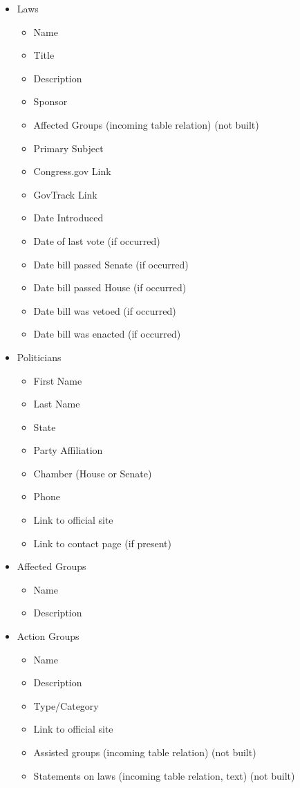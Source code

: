 \documentclass[12pt]{article}
\begin{document}
\begin{itemize}
	\item[] Laws
	\begin{itemize}
		\item Name
		\item Title
		\item Description
		\item Sponsor
		\item Affected Groups (incoming table relation) (not built)
		\item Primary Subject
		\item Congress.gov Link
		\item GovTrack Link
		\item Date Introduced
		\item Date of last vote  (if occurred)
		\item Date bill passed Senate (if occurred)
		\item Date bill passed House (if occurred)
		\item Date bill was vetoed (if occurred)
		\item Date bill was enacted  (if occurred)
	\end{itemize}
	\item[] Politicians
	\begin{itemize}
		\item First Name
		\item Last Name
		\item State
		\item Party Affiliation
		\item Chamber (House or Senate)
		\item Phone
		\item Link to official site
		\item Link to contact page (if present)
	\end{itemize}
	\item[] Affected Groups
	\begin{itemize}
		\item Name
		\item Description
	\end{itemize}
	\item[] Action Groups
	\begin{itemize}
		\item Name
		\item Description
		\item Type/Category
		\item Link to official site
		\item Assisted groups (incoming table relation) (not built)
		\item Statements on laws (incoming table relation, text) (not built)
	\end{itemize}
\end{itemize}
\end{document}
